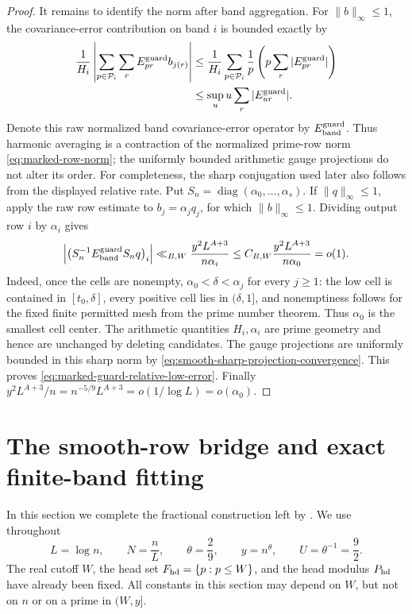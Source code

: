 \documentclass[11pt]{article}
\numberwithin{equation}{section}
\theoremstyle{definition}
\theoremstyle{remark}
\newcommand{\1}{\mathbf 1}
\begin{document}
\begin{proof}
It remains to identify the norm after band aggregation.  For
\(\|b\|_\infty\leq1\), the covariance-error contribution on band \(i\)
is bounded exactly by
\begin{align*}
 \frac1{H_i}\left|\sum_{p\in\mathcal P_i}\sum_r
       E^{\rm guard}_{pr}b_{j(r)}\right|
 &\leq\frac1{H_i}\sum_{p\in\mathcal P_i}\frac1p
       \left(p\sum_r|E^{\rm guard}_{pr}|\right)\\
 &\leq\sup_u u\sum_r|E^{\rm guard}_{ur}|.
\end{align*}
Denote this raw normalized band covariance-error operator by
\(E^{\rm guard}_{\rm band}\).  Thus harmonic averaging is a contraction
of the normalized prime-row norm \eqref{eq:marked-row-norm}; the uniformly
bounded arithmetic gauge projections do not alter its order.  For
completeness, the sharp conjugation used later also follows from the
displayed relative rate.  Put
\(S_n=\operatorname{diag}(\alpha_0,\ldots,\alpha_s)\).  If
\(\|q\|_\infty\leq1\), apply the raw row estimate to
\(b_j=\alpha_jq_j\), for which \(\|b\|_\infty\leq1\).  Dividing output row
\(i\) by \(\alpha_i\) gives
\[
 \left|\bigl(S_n^{-1}E^{\rm guard}_{\rm band}S_nq\bigr)_i\right|
 \ll_{B,W}\frac{y^2L^{A+3}}{n\alpha_i}
 \leq C_{B,W}\frac{y^2L^{A+3}}{n\alpha_0}=o(1).
\]
Indeed, once the cells are nonempty,
\(\alpha_0<\delta<\alpha_j\) for every \(j\geq1\): the low cell is
contained in \([t_0,\delta]\), every positive cell lies in
\((\delta,1]\), and nonemptiness follows for the fixed finite permitted
mesh from the prime number theorem.  Thus \(\alpha_0\) is the smallest
cell center.  The arithmetic quantities \(H_i,\alpha_i\) are prime
geometry and hence are unchanged by deleting candidates.  The gauge projections are uniformly
bounded in this sharp norm by
\eqref{eq:smooth-sharp-projection-convergence}.  This proves
\eqref{eq:marked-guard-relative-low-error}.  Finally
\(y^2L^{A+3}/n=n^{-5/9}L^{A+3}=o(1/\log L)=o(\alpha_0)\).
\end{proof}
 \section{The smooth-row bridge and exact finite-band fitting}
\label{sec:smooth-bridge}

In this section we complete the fractional construction left by
.  We use throughout
\[
 L=\log n,\qquad N=\frac nL,\qquad
 \theta=\frac29,\qquad y=n^\theta,\qquad U=\theta^{-1}=\frac92.
\]
The real cutoff \(W\), the head set
\(F_{\rm hd}=\{p:p\leq W\}\), and the head modulus \(P_{\rm hd}\) have
already been fixed.  All constants in this section may depend on \(W\),
but not on \(n\) or on a prime in \((W,y]\).
\end{document}
